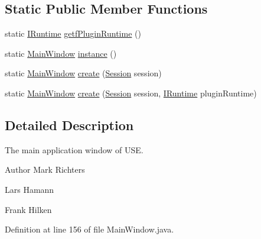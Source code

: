 \subsection*{Static Public Member Functions}
\begin{DoxyCompactItemize}
\item 
static \hyperlink{interfaceorg_1_1tzi_1_1use_1_1main_1_1runtime_1_1_i_runtime}{I\-Runtime} \hyperlink{classorg_1_1tzi_1_1use_1_1gui_1_1main_1_1_main_window_a03d81276b2d09e36bd76735f8c18b23d}{getf\-Plugin\-Runtime} ()
\item 
static \hyperlink{classorg_1_1tzi_1_1use_1_1gui_1_1main_1_1_main_window}{Main\-Window} \hyperlink{classorg_1_1tzi_1_1use_1_1gui_1_1main_1_1_main_window_a8a587b47aec0c0ea55a341961af6c9a1}{instance} ()
\item 
static \hyperlink{classorg_1_1tzi_1_1use_1_1gui_1_1main_1_1_main_window}{Main\-Window} \hyperlink{classorg_1_1tzi_1_1use_1_1gui_1_1main_1_1_main_window_aa2ab4ae62d6928dcbfa0930fb632ae73}{create} (\hyperlink{classorg_1_1tzi_1_1use_1_1main_1_1_session}{Session} session)
\item 
static \hyperlink{classorg_1_1tzi_1_1use_1_1gui_1_1main_1_1_main_window}{Main\-Window} \hyperlink{classorg_1_1tzi_1_1use_1_1gui_1_1main_1_1_main_window_ad41eb5535bd91018bc4319cf22b15acf}{create} (\hyperlink{classorg_1_1tzi_1_1use_1_1main_1_1_session}{Session} session, \hyperlink{interfaceorg_1_1tzi_1_1use_1_1main_1_1runtime_1_1_i_runtime}{I\-Runtime} plugin\-Runtime)
\end{DoxyCompactItemize}


\subsection{Detailed Description}
The main application window of U\-S\-E.

\begin{DoxyAuthor}{Author}
Mark Richters 

Lars Hamann 

Frank Hilken 
\end{DoxyAuthor}


Definition at line 156 of file Main\-Window.\-java.



